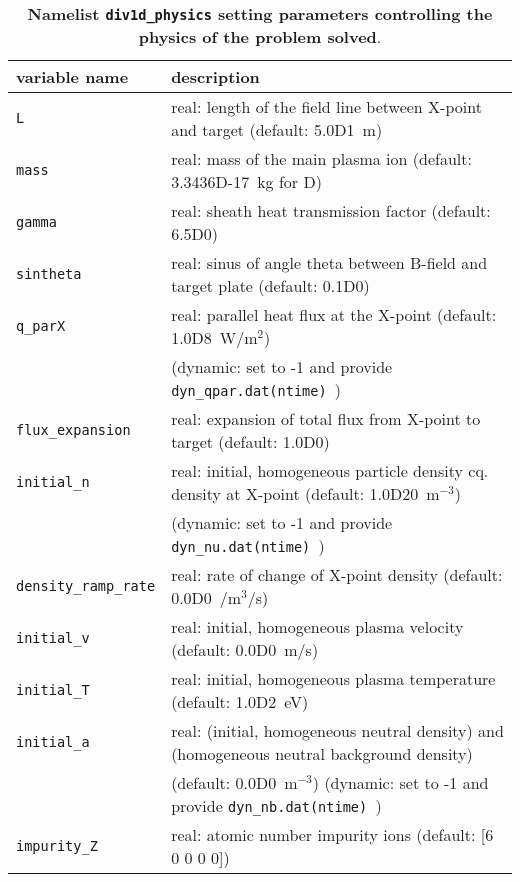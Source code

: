 \documentclass[amsmath,amssymb,a4]{revtex4-2}
\begin{document}
\begin{table}[h]
\begin{center}
  \caption{{\bf Namelist {\tt div1d\_physics} setting parameters controlling the physics of the problem solved}. }
  \label{tab:input_physics}
  \begin{tabular}{|| l  | l ||}
    \hline\hline
    variable name                & description \\ \hline\hline
    {\tt L}                      & real: length of the field line between X-point and target (default: 5.0D1~m) \\ \hline
    {\tt mass}                   & real: mass of the main plasma ion (default: 3.3436D-17~kg for D) \\ \hline
    {\tt gamma}                  & real: sheath heat transmission factor (default: 6.5D0) \\ \hline
    {\tt sintheta}               & real: sinus of angle theta between B-field and target plate (default: 0.1D0) \\ \hline
    {\tt q\_parX}                & real: parallel heat flux at the X-point (default: 1.0D8~W/m$^2$)	\\
    				& (dynamic: set to -1 and provide {\tt dyn\_qpar.dat(ntime) }) \\ \hline
    {\tt flux\_expansion}        & real: expansion of total flux from X-point to target (default: 1.0D0) \\ \hline
    {\tt initial\_n}             & real: initial, homogeneous particle density cq. density at X-point (default: 1.0D20~m$^{-3}$) \\ 
    				& (dynamic: set to -1 and provide {\tt dyn\_nu.dat(ntime) }) \\ \hline
    {\tt density\_ramp\_rate}    & real: rate of change of X-point density (default: 0.0D0~/m$^3$/s) \\ \hline
    {\tt initial\_v}             & real: initial, homogeneous plasma velocity (default: 0.0D0~m/s) \\ \hline
    {\tt initial\_T}             & real: initial, homogeneous plasma temperature (default: 1.0D2~eV) \\ \hline
    {\tt initial\_a}             & real: (initial, homogeneous neutral density) and (homogeneous neutral background density) \\ 
    &  (default: 0.0D0~m$^{-3}$) (dynamic: set to -1 and provide {\tt dyn\_nb.dat(ntime) }) \\ \hline
    {\tt impurity\_Z}  & real: atomic number impurity ions (default: [6 0 0 0 0]) \\ \hline

\end{tabular}
\end{center}
\end{table}
\end{document}
